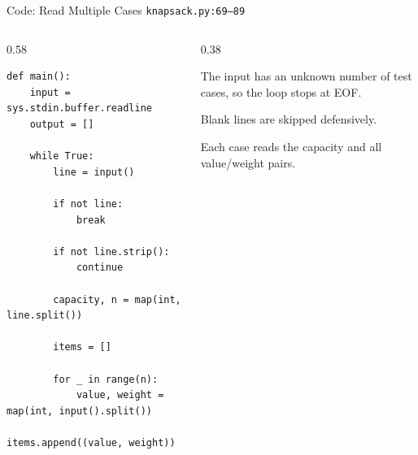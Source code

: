 \documentclass[aspectratio=169,11pt]{beamer}
\begin{document}
\begin{frame}[fragile]{Code: Read Multiple Cases}
\scriptsize
{} \texttt{knapsack.py:69--89}

\vspace{0.08cm}
\begin{columns}[T,totalwidth=\textwidth]
\begin{column}{0.58\textwidth}
\begin{lstlisting}[style=cpcode]
def main():
    input = sys.stdin.buffer.readline
    output = []

    while True:
        line = input()

        if not line:
            break

        if not line.strip():
            continue

        capacity, n = map(int, line.split())

        items = []

        for _ in range(n):
            value, weight = map(int, input().split())
            items.append((value, weight))
\end{lstlisting}
\end{column}
\begin{column}{0.38\textwidth}
\begin{tightitemize}
  \item The input has an unknown number of test cases, so the loop stops at EOF.
  \item Blank lines are skipped defensively.
  \item Each case reads the capacity and all value/weight pairs.
\end{tightitemize}
\end{column}
\end{columns}
\end{frame}
\end{document}
